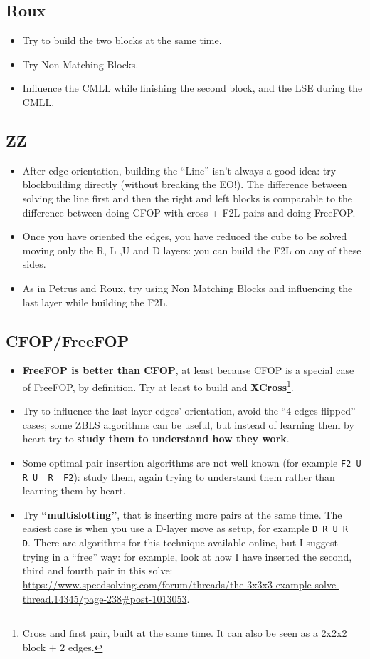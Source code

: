 \documentclass[11pt,a4paper]{book}
\newcommand{\p}{\textquotesingle}
\newcommand{\m}{\texttt}
\newcommand{\ps}{\p\,\,}
\begin{document}
\subsection{Roux}
\begin{itemize}
\item Try to build the two blocks at the same time.
\item Try Non Matching Blocks.
\item Influence the CMLL while finishing the second block, and the LSE during the CMLL.
\end{itemize}

\subsection{ZZ}
\begin{itemize}
\item After edge orientation, building the ``Line'' isn't always a good idea: try blockbuilding directly (without breaking the EO!). The difference between solving the line first and then the right and left blocks is comparable to the difference between doing CFOP with cross + F2L pairs and doing FreeFOP.
\item Once you have oriented the edges, you have reduced the cube to be solved moving only the R, L ,U and D layers: you can build the F2L on any of these sides.
\item As in Petrus and Roux, try using Non Matching Blocks and influencing the last layer while building the F2L.
\end{itemize}

\subsection{CFOP/FreeFOP}
\begin{itemize}
\item \textbf{FreeFOP is better than CFOP}, at least because CFOP is a special case of FreeFOP, by definition. Try at least to build and \textbf{XCross}\footnote{Cross and first pair, built at the same time. It can also be seen as a 2x2x2 block + 2 edges.}.
\item Try to influence the last layer edges' orientation, avoid the ``4 edges flipped'' cases; some ZBLS algorithms can be useful, but instead of learning them by heart try to \textbf{study them to understand how they work}.
\item Some optimal pair insertion algorithms are not well known (for example \m{F2 U R U\ps R\ps F2}): study them, again trying to understand them rather than learning them by heart.
\item Try \textbf{``multislotting''}, that is inserting more pairs at the same time. The easiest case is when you use a D-layer move as setup, for example \m{D R U R\ps D\p}. There are algorithms for this technique available online, but I suggest trying in a ``free'' way: for example, look at how I have inserted the second, third and fourth pair in this solve: \url{https://www.speedsolving.com/forum/threads/the-3x3x3-example-solve-thread.14345/page-238#post-1013053}.
\end{itemize}
\end{document}
